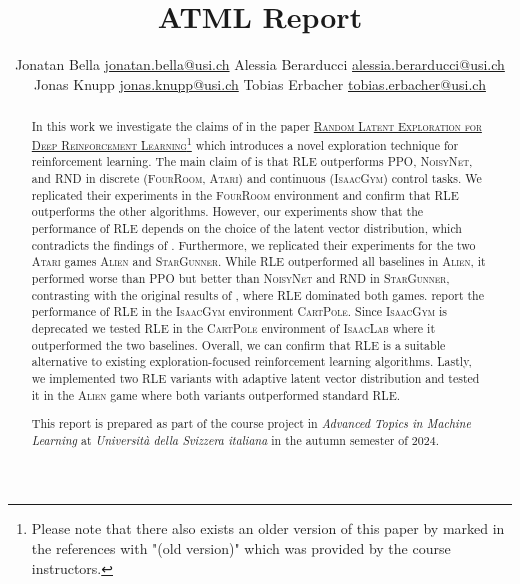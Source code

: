 \documentclass[10pt]{article} %
\title{ATML Report}
\author{%
  \name Jonatan Bella \email \href{mailto:jonatan.bella@usi.ch}{jonatan.bella@usi.ch}
  \AND
  \name Alessia Berarducci \email \href{mailto:alessia.berarducci@usi.ch}{alessia.berarducci@usi.ch}
  \AND
  \name Jonas Knupp \email \href{mailto:jonas.knupp@usi.ch}{jonas.knupp@usi.ch}
  \AND
  \name Tobias Erbacher \email \href{mailto:tobias.erbacher@usi.ch}{tobias.erbacher@usi.ch}
}
\begin{document}
\maketitle

\begin{abstract}
In this work we investigate the claims of \cite{rle-paper} in the paper \href{https://arxiv.org/abs/2407.13755}{\textsc{Random Latent Exploration for Deep Reinforcement Learning}}\footnote{Please note that there also exists an older version of this paper by \cite{rle-paper-old} marked in the references with "(old version)" which was provided by the course instructors.} which introduces a novel exploration technique for reinforcement learning. The main claim of \cite{rle-paper} is that \textsc{RLE} outperforms \textsc{PPO}, \textsc{NoisyNet}, and \textsc{RND} in discrete (\textsc{FourRoom}, \textsc{Atari}) and continuous (\textsc{IsaacGym}) control tasks. We replicated their experiments in the \textsc{FourRoom} environment and confirm that \textsc{RLE} outperforms the other algorithms. However, our experiments show that the performance of \textsc{RLE} depends on the choice of the latent vector distribution, which contradicts the findings of \cite{rle-paper}. Furthermore, we replicated their experiments for the two \textsc{Atari} games \textsc{Alien} and \textsc{StarGunner}. While \textsc{RLE} outperformed all baselines in \textsc{Alien}, it performed worse than \textsc{PPO} but better than \textsc{NoisyNet} and \textsc{RND} in \textsc{StarGunner}, contrasting with the original results of \cite{rle-paper}, where \textsc{RLE} dominated both games. \cite{rle-paper} report the performance of \textsc{RLE} in the \textsc{IsaacGym} environment \textsc{CartPole}. Since \textsc{IsaacGym} is deprecated we tested \textsc{RLE} in the \textsc{CartPole} environment of \textsc{IsaacLab} where it outperformed the two baselines. Overall, we can confirm that \textsc{RLE} is a suitable alternative to existing exploration-focused reinforcement learning algorithms. Lastly, we implemented two \textsc{RLE} variants with adaptive latent vector distribution and tested it in the \textsc{Alien} game where both variants outperformed standard \textsc{RLE}.


This report is prepared as part of the course project in \textit{Advanced Topics in Machine Learning} at \textit{Università della Svizzera italiana} in the autumn semester of $2024$. 
\end{abstract}

\vspace{-18pt}
\end{document}
